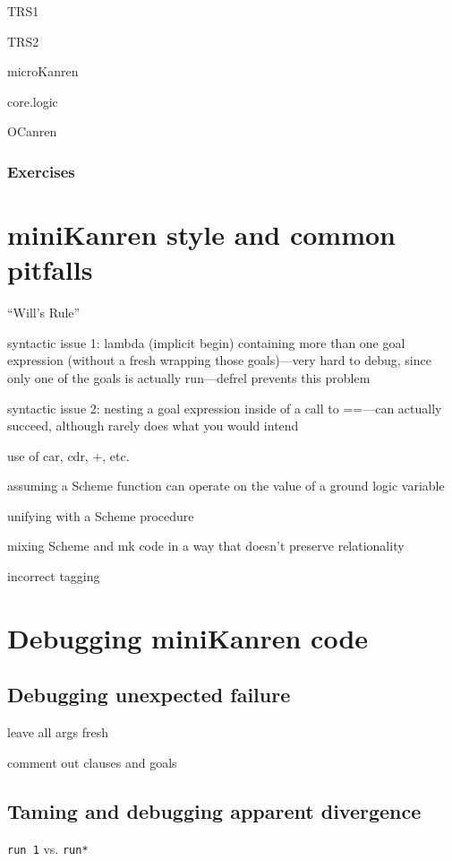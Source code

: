 \documentclass{book}
\begin{document}
TRS1

TRS2

microKanren

core.logic

OCanren

\subsection{Exercises}


\chapter{miniKanren style and common pitfalls}%

``Will's Rule''

syntactic issue 1:
lambda (implicit begin) containing more than one goal expression (without a fresh wrapping those goals)---very hard to debug, since only one of the goals is actually run---defrel prevents this problem

syntactic issue 2:
nesting a goal expression inside of a call to ==---can actually succeed, although rarely does what you would intend

use of car, cdr, +, etc.

assuming a Scheme function can operate on the value of a ground logic variable

unifying with a Scheme procedure

mixing Scheme and mk code in a way that doesn't preserve relationality

incorrect tagging

\chapter{Debugging miniKanren code}%

\section{Debugging unexpected failure}

leave all args fresh

comment out clauses and goals

\section{Taming and debugging apparent divergence}

\verb|run 1| vs. \verb|run*|
\end{document}
